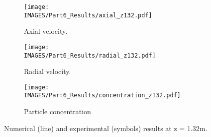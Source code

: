 \begin{figure}[H]
\begin{subfigure}{0.33\textwidth}
\texttt{[image: \\IMAGES/Part6\_Results/axial\_z132.pdf]}
\caption{Axial velocity.}\label{lag:axial_z132}
\end{subfigure}
\begin{subfigure}{0.33\textwidth}
\texttt{[image: \\IMAGES/Part6\_Results/radial\_z132.pdf]}
\caption{Radial velocity.}\label{lag:radial_z132}
\end{subfigure}
\begin{subfigure}{0.33\textwidth}
\centering
\texttt{[image: \\IMAGES/Part6\_Results/concentration\_z132.pdf]}
\caption{Particle concentration}\label{lag:conc_z132}
\end{subfigure}
\captionsetup{justification=centering}
\caption{Numerical (line) and experimental\cite{Arnason} (symbols) results at z = 1.32m.}
\label{lag:z132}
\end{figure}
